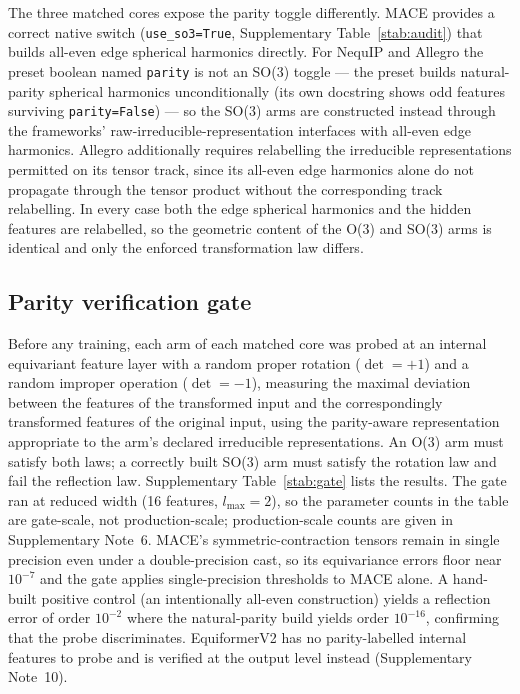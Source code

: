The three matched cores expose the parity toggle differently. MACE provides a correct native switch (\texttt{use\_so3=True}, Supplementary Table~\ref{stab:audit}) that builds all-even edge spherical harmonics directly. For NequIP and Allegro the preset boolean named \texttt{parity} is not an SO(3) toggle --- the preset builds natural-parity spherical harmonics unconditionally (its own docstring shows odd features surviving \texttt{parity=False}) --- so the SO(3) arms are constructed instead through the frameworks' raw-irreducible-representation interfaces with all-even edge harmonics. Allegro additionally requires relabelling the irreducible representations permitted on its tensor track, since its all-even edge harmonics alone do not propagate through the tensor product without the corresponding track relabelling. In every case both the edge spherical harmonics and the hidden features are relabelled, so the geometric content of the O(3) and SO(3) arms is identical and only the enforced transformation law differs.

\subsection*{Parity verification gate}

Before any training, each arm of each matched core was probed at an internal equivariant feature layer with a random proper rotation ($\det = +1$) and a random improper operation ($\det = -1$), measuring the maximal deviation between the features of the transformed input and the correspondingly transformed features of the original input, using the parity-aware representation appropriate to the arm's declared irreducible representations. An O(3) arm must satisfy both laws; a correctly built SO(3) arm must satisfy the rotation law and fail the reflection law. Supplementary Table~\ref{stab:gate} lists the results. The gate ran at reduced width (16 features, $l_{\max}=2$), so the parameter counts in the table are gate-scale, not production-scale; production-scale counts are given in Supplementary Note~6. MACE's symmetric-contraction tensors remain in single precision even under a double-precision cast, so its equivariance errors floor near $10^{-7}$ and the gate applies single-precision thresholds to MACE alone. A hand-built positive control (an intentionally all-even construction) yields a reflection error of order $10^{-2}$ where the natural-parity build yields order $10^{-16}$, confirming that the probe discriminates. EquiformerV2 has no parity-labelled internal features to probe and is verified at the output level instead (Supplementary Note~10).

